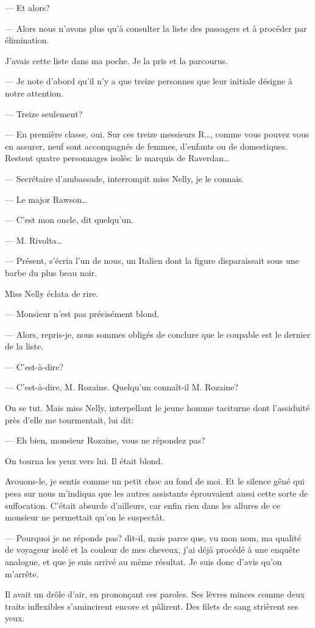 \documentclass[12pt,a4paper]{article}
\begin{document}
— Et alors?

— Alors nous n’avons plus qu’à consulter la liste des passagers et à procéder par élimination.

J’avais cette liste dans ma poche. Je la pris et la parcourus. 

— Je note d’abord qu’il n’y a que treize personnes que leur initiale désigne à notre attention.

— Treize seulement?

— En première classe, oui. Sur ces treize messieurs R…, comme vous pouvez vous en assurer, neuf sont accompagnés de femmes, d’enfants ou de domestiques. Restent quatre personnages isolés: le marquis de Raverdan…

— Secrétaire d’ambassade, interrompit miss Nelly, je le connais.

— Le major Rawson…

— C’est mon oncle, dit quelqu’un.

— M. Rivolta…

— Présent, s’écria l’un de nous, un Italien dont la figure disparaissait sous une barbe du plus beau noir.

Miss Nelly éclata de rire.

— Monsieur n’est pas précisément blond.

— Alors, repris-je, nous sommes obligés de conclure que le coupable est le dernier de la liste.

— C’est-à-dire?

— C’est-à-dire, M. Rozaine. Quelqu’un connaît-il M. Rozaine?

On se tut. Mais miss Nelly, interpellant le jeune homme taciturne dont l’assiduité près d’elle me tourmentait, lui dit:

— Eh bien, monsieur Rozaine, vous ne répondez pas? 

On tourna les yeux vers lui. Il était blond.

Avouons-le, je sentis comme un petit choc au fond de moi. Et le silence gêné qui pesa sur nous m’indiqua que les autres assistants éprouvaient aussi cette sorte de suffocation. C’était absurde d’ailleurs, car enfin rien dans les allures de ce monsieur ne permettait qu’on le suspectât.

— Pourquoi je ne réponds pas? dit-il, mais parce que, vu mon nom, ma qualité de voyageur isolé et la couleur de mes cheveux, j’ai déjà procédé à une enquête analogue, et que je suis arrivé au même résultat. Je suis donc d’avis qu’on m’arrête.

Il avait un drôle d’air, en prononçant ces paroles. Ses lèvres minces comme deux traits inflexibles s’amincirent encore et pâlirent. Des filets de sang strièrent ses yeux.
\end{document}
